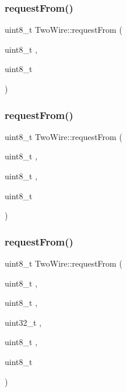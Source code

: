 \mbox{\label{class_two_wire_ae27d0936487551a05a1e9901bc456599}} 
\subsubsection{\texorpdfstring{request\+From()}{requestFrom()}\hspace{0.1cm}{\footnotesize\ttfamily [1/5]}}
{\footnotesize\ttfamily uint8\+\_\+t Two\+Wire\+::request\+From (\begin{DoxyParamCaption}\item[{uint8\+\_\+t}]{,  }\item[{uint8\+\_\+t}]{ }\end{DoxyParamCaption})}

\mbox{\label{class_two_wire_a4b4b618531a04d5488a52583a3dfb173}} 
\subsubsection{\texorpdfstring{request\+From()}{requestFrom()}\hspace{0.1cm}{\footnotesize\ttfamily [2/5]}}
{\footnotesize\ttfamily uint8\+\_\+t Two\+Wire\+::request\+From (\begin{DoxyParamCaption}\item[{uint8\+\_\+t}]{,  }\item[{uint8\+\_\+t}]{,  }\item[{uint8\+\_\+t}]{ }\end{DoxyParamCaption})}

\mbox{\label{class_two_wire_acd59cc9570fd49b1cf9044cbefef85ac}} 
\subsubsection{\texorpdfstring{request\+From()}{requestFrom()}\hspace{0.1cm}{\footnotesize\ttfamily [3/5]}}
{\footnotesize\ttfamily uint8\+\_\+t Two\+Wire\+::request\+From (\begin{DoxyParamCaption}\item[{uint8\+\_\+t}]{,  }\item[{uint8\+\_\+t}]{,  }\item[{uint32\+\_\+t}]{,  }\item[{uint8\+\_\+t}]{,  }\item[{uint8\+\_\+t}]{ }\end{DoxyParamCaption})}

